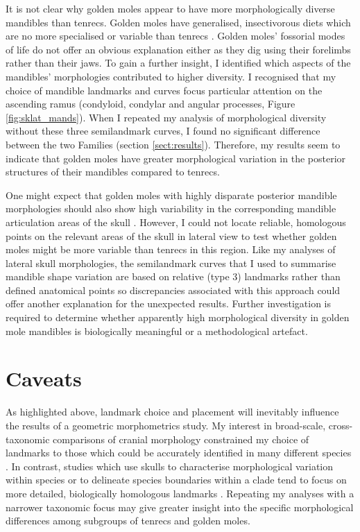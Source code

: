 	It is not clear why golden moles appear to have more morphologically diverse mandibles than tenrecs. Golden moles have generalised, insectivorous diets \citep{Bronner1995} which are no more specialised or variable than tenrecs \citep{Soarimalala2011}. Golden moles' fossorial modes of life do not offer an obvious explanation either as they dig using their forelimbs rather than their jaws.
	To gain a further insight, I identified which aspects of the mandibles' morphologies contributed to higher diversity. I recognised that 
	my choice of mandible landmarks and curves focus particular attention on the ascending ramus (condyloid, condylar and angular processes, Figure \ref{fig:sklat_mands}). When I repeated my analysis of morphological diversity without these three semilandmark curves, I found no significant difference between the two Families (section \ref{sect:results}). Therefore, my results seem to indicate that golden moles have greater morphological variation in the posterior structures of their mandibles compared to tenrecs. 
	
	One might expect that golden moles with highly disparate posterior mandible morphologies should also show high variability in the corresponding mandible articulation areas of the skull \citep[although developmental genetics studies have revealed that mandibles can also develop shape variation independently of skulls, ][] {Rot-Nikcevic2007}. However, I could not locate reliable, homologous points on the relevant areas of the skull in lateral view to test whether golden moles might be more variable than tenrecs in this region. Like my analyses of lateral skull morphologies, the semilandmark curves that I used to summarise mandible shape variation are based on relative (type 3) landmarks rather than defined anatomical points \citep{Zelditch2012} so discrepancies associated with this approach could offer another explanation for the unexpected results. Further investigation is required to determine whether apparently high morphological diversity in golden mole mandibles is biologically meaningful or a methodological artefact. 

		
\section{Caveats}
\label{sect:caveats}

	As highlighted above, landmark choice and placement will inevitably influence the results of a geometric morphometrics study. My interest in broad-scale, cross-taxonomic comparisons of cranial morphology constrained my choice of landmarks to those which could be accurately identified in many different species \citep[e.g.][]{Ruta2013, Goswami2011, Wroe2007}. In contrast, studies which use skulls to characterise morphological variation within species \citep{Blagojevic2011, Bornholdt2008} or to delineate species boundaries within a clade \citep[e.g.][]{Panchetti2008} tend to focus on more detailed, biologically homologous landmarks \citep{Zelditch2012}. Repeating my analyses with a narrower taxonomic focus may give greater insight into the specific morphological differences among subgroups of tenrecs and golden moles.
	
